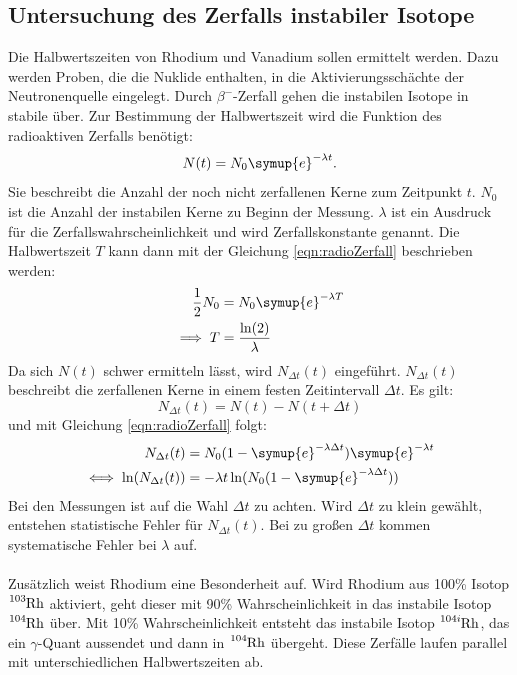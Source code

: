 \subsection{Untersuchung des Zerfalls instabiler Isotope}
Die Halbwertszeiten von Rhodium und Vanadium sollen ermittelt werden.
Dazu werden Proben, die die Nuklide enthalten, in die Aktivierungsschächte der Neutronenquelle eingelegt.
Durch $\beta^-$-Zerfall gehen die instabilen Isotope in stabile über.
Zur Bestimmung der Halbwertszeit wird die Funktion des radioaktiven Zerfalls benötigt:
\begin{equation}\label{eqn:radioZerfall}
    N(t) = N_0 \symup{e} ^{-\lambda t} .
\end{equation}
Sie beschreibt die Anzahl der noch nicht zerfallenen Kerne zum Zeitpunkt $t$.
$N_0$ ist die Anzahl der instabilen Kerne zu Beginn der Messung.
$\lambda$ ist ein Ausdruck für die Zerfallswahrscheinlichkeit und wird Zerfallskonstante genannt.
Die Halbwertszeit $T$ kann dann mit der Gleichung \eqref{eqn:radioZerfall} beschrieben werden:
\begin{align}
    \frac{1}{2} N_0 & = N_0 \symup{e}^{-\lambda T} \\* \label{eqn:halbwertszeit}
    \implies T & = \frac{\ln(2)}{\lambda} 
\end{align}
Da sich $N(t)$ schwer ermitteln lässt, wird $N_{\Delta t}(t)$ eingeführt.
$N_{\Delta t}(t)$ beschreibt die zerfallenen Kerne in einem festen Zeitintervall $\Delta t$.
Es gilt:
\begin{equation*}
    N_{\Delta t}(t) = N(t) - N(t + \Delta t)
\end{equation*}
und mit Gleichung \eqref{eqn:radioZerfall} folgt:
\begin{align*}
    N_{\Delta t}(t) & = N_0 (1 - \symup{e}^{-\lambda\Delta t}) \symup{e}^{-\lambda t}\\
    \iff \ln(N_{\Delta t}(t)) & = -\lambda t \ln(N_0(1 - \symup{e}^{-\lambda\Delta t}))
\end{align*}
Bei den Messungen ist auf die Wahl $\Delta t $ zu achten.
Wird $\Delta t $ zu klein gewählt, entstehen statistische Fehler für $N_{\Delta t}(t)$.
Bei zu großen $\Delta t$ kommen systematische Fehler bei $\lambda$ auf.\\
\\
Zusätzlich weist Rhodium eine Besonderheit auf.
Wird Rhodium aus 100\% Isotop $\ce{^{103}Rh}$ aktiviert, geht dieser mit 90\% Wahrscheinlichkeit in das instabile Isotop $\ce{^{104}Rh}$ über.
Mit 10\% Wahrscheinlichkeit entsteht das instabile Isotop $\ce{^{104i}Rh}$, das ein $\gamma$-Quant aussendet und dann in $\ce{^{104}Rh}$ übergeht.
Diese Zerfälle laufen parallel mit unterschiedlichen Halbwertszeiten ab.

